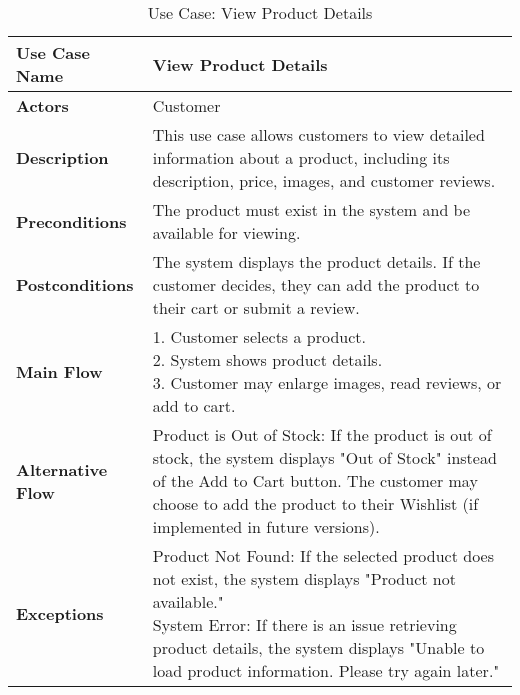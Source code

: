 \begin{table}[h]
\centering
\renewcommand{\arraystretch}{1.2}
\begin{tabular}{|p{3cm}|p{10cm}|}
\hline
\textbf{Use Case Name} & View Product Details \\
\hline
\textbf{Actors} & Customer \\
\hline
\textbf{Description} & This use case allows customers to view detailed information about a product, including its description, price, images, and customer reviews. \\
\hline
\textbf{Preconditions} & The product must exist in the system and be available for viewing. \\
\hline
\textbf{Postconditions} & The system displays the product details. If the customer decides, they can add the product to their cart or submit a review. \\
\hline
\textbf{Main Flow} & \makecell[l]{1. Customer selects a product. \\ 2. System shows product details. \\ 3. Customer may enlarge images, read reviews, or add to cart.} \\
\hline
\textbf{Alternative Flow} & Product is Out of Stock: If the product is out of stock, the system displays "Out of Stock" instead of the Add to Cart button. The customer may choose to add the product to their Wishlist (if implemented in future versions). \\
\hline
\textbf{Exceptions} & \parbox[t]{10cm}{Product Not Found: If the selected product does not exist, the system displays "Product not available." \\ System Error: If there is an issue retrieving product details, the system displays "Unable to load product information. Please try again later."} \\
\hline
\end{tabular}
\caption{Use Case: View Product Details}
\end{table}

